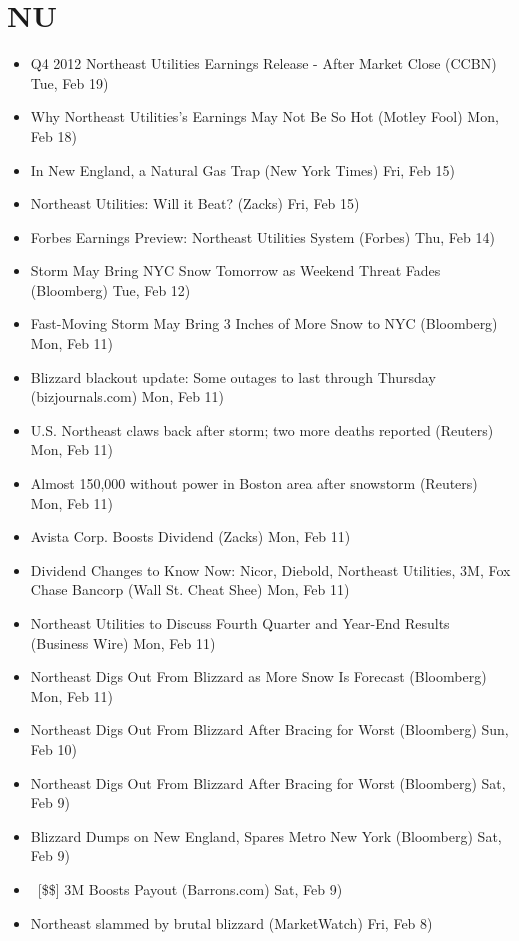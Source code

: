 \documentclass[11pt,asymmetric]{article}
\begin{document}
\section*{NU}
\begin{itemize}
\item Q4 2012 Northeast Utilities Earnings Release - After Market Close (CCBN) Tue, Feb 19)
\item Why Northeast Utilities's Earnings May Not Be So Hot (Motley Fool) Mon, Feb 18)
\item In New England, a Natural Gas Trap (New York Times) Fri, Feb 15)
\item Northeast Utilities: Will it Beat? (Zacks) Fri, Feb 15)
\item Forbes Earnings Preview: Northeast Utilities System (Forbes) Thu, Feb 14)
\item Storm May Bring NYC Snow Tomorrow as Weekend Threat Fades (Bloomberg) Tue, Feb 12)
\item Fast-Moving Storm May Bring 3 Inches of More Snow to NYC (Bloomberg) Mon, Feb 11)
\item Blizzard blackout update: Some outages to last through Thursday (bizjournals.com) Mon, Feb 11)
\item U.S. Northeast claws back after storm; two more deaths reported (Reuters) Mon, Feb 11)
\item Almost 150,000 without power in Boston area after snowstorm (Reuters) Mon, Feb 11)
\item Avista Corp. Boosts Dividend (Zacks) Mon, Feb 11)
\item Dividend Changes to Know Now: Nicor, Diebold, Northeast Utilities, 3M, Fox Chase Bancorp (Wall St. Cheat Shee) Mon, Feb 11)
\item Northeast Utilities to Discuss Fourth Quarter and Year-End Results (Business Wire) Mon, Feb 11)
\item Northeast Digs Out From Blizzard as More Snow Is Forecast (Bloomberg) Mon, Feb 11)
\item Northeast Digs Out From Blizzard After Bracing for Worst (Bloomberg) Sun, Feb 10)
\item Northeast Digs Out From Blizzard After Bracing for Worst (Bloomberg) Sat, Feb 9)
\item Blizzard Dumps on New England, Spares Metro New York (Bloomberg) Sat, Feb 9)
\item\ [\$\$] 3M Boosts Payout (Barrons.com) Sat, Feb 9)
\item Northeast slammed by brutal blizzard (MarketWatch) Fri, Feb 8)

\end{itemize}
\end{document}
